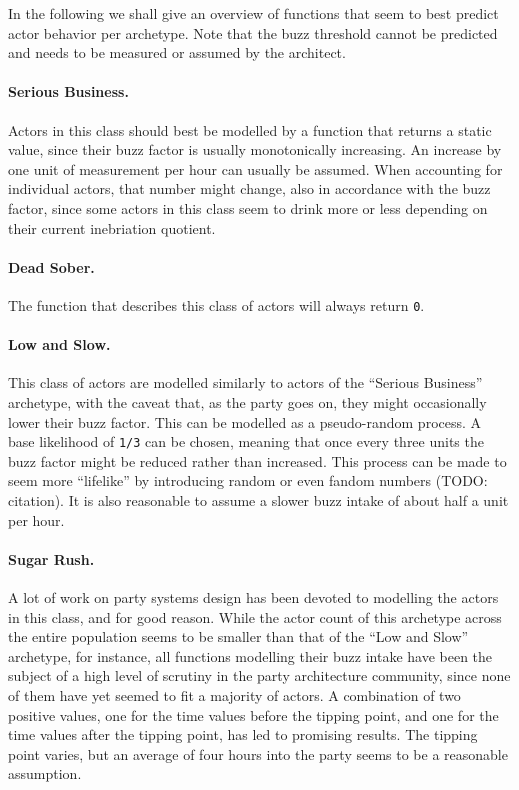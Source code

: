\documentclass[twocolumn]{article}
\begin{document}
In the following we shall give an overview of functions that seem to best
predict actor behavior per archetype. Note that the buzz threshold cannot be
predicted and needs to be measured or assumed by the architect.

\paragraph{Serious Business.} Actors in this class should best be modelled by a
function that returns a static value, since their buzz factor is usually
monotonically increasing. An increase by one unit of measurement per hour can
usually be assumed. When accounting for individual actors, that number might
change, also in accordance with the buzz factor, since some actors in this class
seem to drink more or less depending on their current inebriation quotient.


\paragraph{Dead Sober.} The function that describes this class of actors will
always return \texttt{0}.


\paragraph{Low and Slow.} This class of actors are modelled similarly to actors
of the “Serious Business” archetype, with the caveat that, as the party goes on,
they might occasionally lower their buzz factor. This can be modelled as a
pseudo-random process. A base likelihood of \texttt{1/3} can be chosen, meaning
that once every three units the buzz factor might be reduced rather than
increased. This process can be made to seem more “lifelike” by introducing
random or even fandom numbers (TODO: citation). It is also reasonable to assume
a slower buzz intake of about half a unit per hour.


\paragraph{Sugar Rush.} A lot of work on party systems design has been devoted
to modelling the actors in this class, and for good reason. While the actor
count of this archetype across the entire population seems to be smaller than
that of the “Low and Slow” archetype, for instance, all functions modelling
their buzz intake have been the subject of a high level of scrutiny in the
party architecture community, since none of them have yet seemed to fit a
majority of actors. A combination of two positive values, one for the time
values before the tipping point, and one for the time values after the tipping
point, has led to promising results. The tipping point varies, but an average of
four hours into the party seems to be a reasonable assumption.
\end{document}

